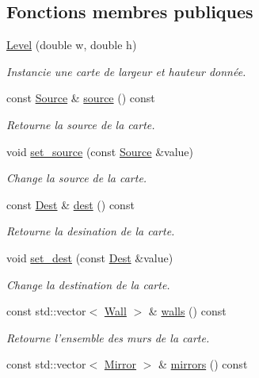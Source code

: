 \subsection*{Fonctions membres publiques}
\begin{DoxyCompactItemize}
\item 
\hyperlink{classLevel_a36092f5c2dc5d1cace19cbdea946b1a4}{Level} (double w, double h)
\begin{DoxyCompactList}\small\item\em Instancie une carte de largeur et hauteur donnée. \end{DoxyCompactList}\item 
const \hyperlink{classSource}{Source} \& \hyperlink{classLevel_a4f7eb7f4859a1bcc436e51f9e31c64b7}{source} () const 
\begin{DoxyCompactList}\small\item\em Retourne la source de la carte. \end{DoxyCompactList}\item 
void \hyperlink{classLevel_af6c587419e5fac477e4ba530ac9ca327}{set\+\_\+source} (const \hyperlink{classSource}{Source} \&value)
\begin{DoxyCompactList}\small\item\em Change la source de la carte. \end{DoxyCompactList}\item 
const \hyperlink{classDest}{Dest} \& \hyperlink{classLevel_a2d068b34ef9af207645054336e5e19d7}{dest} () const 
\begin{DoxyCompactList}\small\item\em Retourne la desination de la carte. \end{DoxyCompactList}\item 
void \hyperlink{classLevel_a86a9a5ad741890af1501e4ede4022d1a}{set\+\_\+dest} (const \hyperlink{classDest}{Dest} \&value)
\begin{DoxyCompactList}\small\item\em Change la destination de la carte. \end{DoxyCompactList}\item 
const std\+::vector$<$ \hyperlink{classWall}{Wall} $>$ \& \hyperlink{classLevel_add82438c31441eaf067b3c4c290c34bc}{walls} () const 
\begin{DoxyCompactList}\small\item\em Retourne l'ensemble des murs de la carte. \end{DoxyCompactList}\item 
const std\+::vector$<$ \hyperlink{classMirror}{Mirror} $>$ \& \hyperlink{classLevel_aa135dbdea931709337ffcb2fd1ac6b68}{mirrors} () const 

\end{DoxyCompactItemize}
